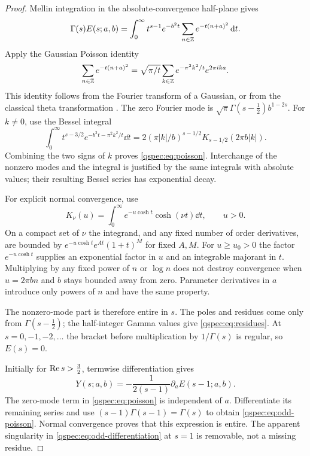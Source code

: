 \begin{proof}
Mellin integration in the absolute-convergence half-plane gives
\[
\Gamma(s)E(s;a,b)
=\int_0^\infty t^{s-1}e^{-b^2t}
\sum_{n\in\mathbb Z}e^{-t(n+a)^2}\,\mathrm{d} t.
\]
Apply the Gaussian Poisson identity
\[
\sum_{n\in\mathbb Z}e^{-t(n+a)^2}
=\sqrt{\pi/t}\sum_{k\in\mathbb Z}e^{-\pi^2k^2/t}e^{2\pi ika}.
\]
This identity follows from the Fourier transform of a Gaussian, or from
the classical theta transformation \cite{theta}. The zero Fourier mode
is $\sqrt\pi\Gamma(s-\tfrac12)b^{1-2s}$. For $k\ne0$, use the
Bessel integral \cite{bessel}
\[
\int_0^\infty t^{s-3/2}e^{-b^2t-\pi^2k^2/t}\dd t
=2(\pi|k|/b)^{s-1/2}K_{s-1/2}(2\pi b|k|).
\]
Combining the two signs of $k$ proves \eqref{qspec:eq:poisson}.
Interchange of the nonzero modes and the integral is justified by the
same integrals with absolute values; their resulting Bessel series has
exponential decay.

For explicit normal convergence, use
\begin{equation}\label{qspec:eq:K-cosh}
K_\nu(u)=\int_0^\infty e^{-u\cosh t}\cosh(\nu t)\dd t,
\qquad u>0.
\end{equation}
On a compact set of $\nu$ the integrand, and any fixed number of order
derivatives, are bounded by $e^{-u\cosh t}e^{A t}(1+t)^M$ for fixed
$A,M$. For $u\ge u_0>0$ the factor $e^{-u\cosh t}$ supplies an
exponential factor in $u$ and an integrable majorant in $t$. Multiplying
by any fixed power of $n$ or $\log n$ does not destroy convergence when
$u=2\pi bn$ and $b$ stays bounded away from zero. Parameter derivatives
in $a$ introduce only powers of $n$ and have the same property.

The nonzero-mode part is therefore entire in $s$. The poles and residues
come only from $\Gamma(s-\tfrac12)$; the half-integer Gamma values give
\eqref{qspec:eq:residues}. At $s=0,-1,-2,\ldots$ the bracket before
multiplication by $1/\Gamma(s)$ is regular, so $E(s)=0$.

Initially for $\operatorname{Re} s>\tfrac32$, termwise differentiation gives
\begin{equation}\label{qspec:eq:odd-differentiation}
Y(s;a,b)=-\frac1{2(s-1)}\partial_a E(s-1;a,b).
\end{equation}
The zero-mode term in \eqref{qspec:eq:poisson} is independent of $a$.
Differentiate its remaining series and use
$(s-1)\Gamma(s-1)=\Gamma(s)$ to obtain
\eqref{qspec:eq:odd-poisson}. Normal convergence proves that this expression
is entire. The apparent singularity in \eqref{qspec:eq:odd-differentiation}
at $s=1$ is removable, not a missing residue.
\end{proof}


